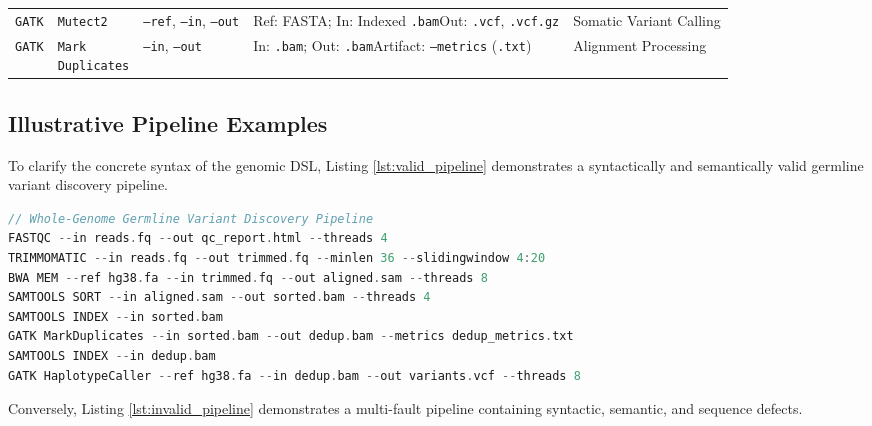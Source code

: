 \documentclass[12pt,a4paper]{article}
\begin{document}
\begin{table}[H]
\begin{tabularx}{\textwidth}{>{\raggedright\arraybackslash}p{2.35cm} >{\raggedright\arraybackslash}p{2.2cm} >{\raggedright\arraybackslash}p{2.45cm} >{\raggedright\arraybackslash}X >{\raggedright\arraybackslash}p{2.05cm}}
\addlinespace
\texttt{GATK} & \texttt{Mutect2} & \texttt{--ref}, \texttt{--in}, \texttt{--out} & Ref: FASTA; In: Indexed \texttt{.bam}\newline Out: \texttt{.vcf}, \texttt{.vcf.gz} & Somatic Variant Calling \\
\addlinespace
\texttt{GATK} & \makecell[l]{\texttt{Mark}\\\texttt{Duplicates}} & \texttt{--in}, \texttt{--out} & In: \texttt{.bam}; Out: \texttt{.bam}\newline Artifact: \texttt{--metrics} (\texttt{.txt}) & Alignment Processing \\
\bottomrule
\end{tabularx}
\end{table}

\subsection{Illustrative Pipeline Examples}

To clarify the concrete syntax of the genomic DSL, Listing \ref{lst:valid_pipeline} demonstrates a syntactically and semantically valid germline variant discovery pipeline.

\begin{lstlisting}[language=C, caption={A fully valid Whole Genome Sequencing (WGS) pipeline in the Genomic DSL.}, label={lst:valid_pipeline}]
// Whole-Genome Germline Variant Discovery Pipeline
FASTQC --in reads.fq --out qc_report.html --threads 4
TRIMMOMATIC --in reads.fq --out trimmed.fq --minlen 36 --slidingwindow 4:20
BWA MEM --ref hg38.fa --in trimmed.fq --out aligned.sam --threads 8
SAMTOOLS SORT --in aligned.sam --out sorted.bam --threads 4
SAMTOOLS INDEX --in sorted.bam
GATK MarkDuplicates --in sorted.bam --out dedup.bam --metrics dedup_metrics.txt
SAMTOOLS INDEX --in dedup.bam
GATK HaplotypeCaller --ref hg38.fa --in dedup.bam --out variants.vcf --threads 8
\end{lstlisting}

Conversely, Listing \ref{lst:invalid_pipeline} demonstrates a multi-fault pipeline containing syntactic, semantic, and sequence defects.
\end{document}
